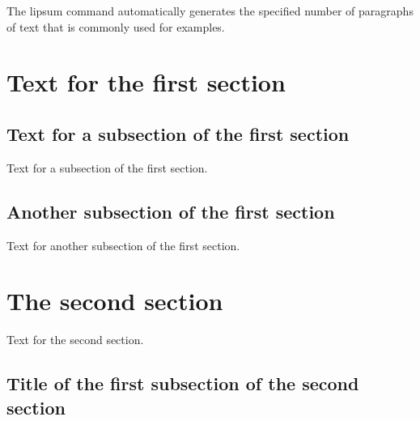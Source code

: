 \documentclass{article}
\begin{document}
The lipsum command automatically generates the specified number of paragraphs of text that is commonly used for examples.

\section{Text for the first section}
  \lipsum[1]
\subsection{Text for a subsection of the first section}
  Text for a subsection of the first section.
\subsection{Another subsection of the first section}
  Text for another subsection of the first section.

\section{The second section}
  Text for the second section.
\subsection{Title of the first subsection of the second section}
\lipsum[2]
\end{document}
